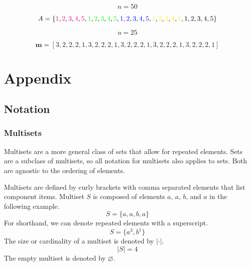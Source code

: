 \documentclass{article}
\begin{document}
\begin{equation}\nonumber
    n = 50
\end{equation}

\begin{equation}\nonumber
    A = \left \{
     \color{magenta}1\color{black}, \color{magenta}2\color{black}, \color{magenta}3\color{black},  \color{magenta}4\color{black}, \color{magenta}5\color{black}, \color{green}1\color{black}, \color{green}2\color{black}, \color{green}3\color{black},  \color{green}4\color{black}, \color{green}5\color{black}, \color{blue}1\color{black}, \color{blue}2\color{black}, \color{blue}3\color{black}, \color{blue}4\color{black}, \color{blue}5\color{black}, \color{yellow}1\color{black}, \color{yellow}2\color{black},  \color{yellow}3\color{black}, \color{yellow}4\color{black}, \color{yellow}5\color{black}, 1, 2, 3, 4, 5\right \}
\end{equation}

\begin{equation}\nonumber
    u = 25
\end{equation}

\begin{equation}\nonumber
    \bm{m} = [3, 2, 2, 2, 1, 3, 2, 2, 2, 1, 3, 2, 2, 2, 1, 3, 2, 2, 2, 1, 3, 2, 2, 2, 1 ]
\end{equation}

\pagebreak
\section{Appendix}
\subsection{Notation}
\subsubsection{Multisets}

Multisets are a more general class of sets that allow for repeated elements. Sets are a subclass of multisets, so all notation for multisets also applies to sets. Both are agnostic to the ordering of elements.

Multisets are defined by curly brackets with comma separated elements that list component items. Multiset $S$ is composed of elements $a$, $a$, $b$, and $a$ in the following example.
\begin{equation}\nonumber
    S = \{a, a, b, a\}
\end{equation}
For shorthand, we can denote repeated elements with a superscript.
\begin{equation}\nonumber
    S = \{a^3, b^1\}
\end{equation}
The size or cardinality of a multiset is denoted by $|\cdot|$.
\begin{equation}\nonumber
    |S| = 4
\end{equation}
The empty multiset is denoted by $\varnothing$.
\end{document}
